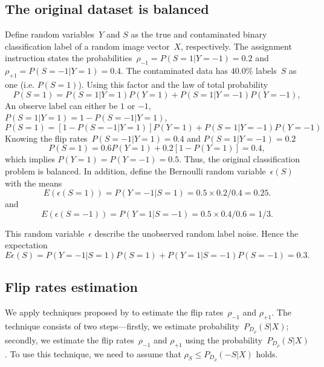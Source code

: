\documentclass[12pt]{article} %
\newcommand{\rhoo}{\rho_{+1}}
\newcommand{\rhoz}{\rho_{-1}}
\begin{document}
\subsection{The original dataset is balanced} \label{sec:1}
Define random variables~$Y$ and $S$ as the true and contaminated binary classification label of a random image vector~$X$, respectively. The assignment instruction states the probabilities~$\rhoz=P(S=1|Y=-1)=0.2$ and $\rhoo=P(S=-1|Y=1)=0.4$.
The contaminated data has $40.0\%$ labels~$S$ as one (i.e. $P(S=1)$). Using this factor and the law of total probability
\begin{equation*}
P(S=1)=P(S=1|Y=1)P(Y=1)+P(S=1|Y=-1)P(Y=-1),
\end{equation*}
An observe label can either be $1$ or $-1$, $P(S=1|Y=1)=1-P(S=-1|Y=1)$,
\begin{equation*}
P(S=1)=\left[1-P(S=-1|Y=1)\right]P(Y=1)+P(S=1|Y=-1)P(Y=-1)
\end{equation*}
Knowing the flip rates~$P(S=-1|Y=1)=0.4$ and $P(S=1|Y=-1)=0.2$
\begin{equation}
P(S=1)=0.6P(Y=1)+0.2\left[1-P(Y=1)\right]=0.4, \label{eq:ps}
\end{equation}
which implies $P(Y=1)=P(Y=-1)=0.5$. Thus, the original classification problem is balanced.
In addition, define the Bernoulli random variable~$\epsilon(S)$ with the means 
\begin{equation}\label{eq:e1}
  E(\epsilon(S=1))=P(Y=-1|S=1)=0.5\times0.2/0.4=0.25.  
\end{equation}
and 
\begin{equation}\label{eq:em1}
  E(\epsilon(S=-1))=P(Y=1|S=-1)=0.5\times0.4/0.6=1/3.  
\end{equation}

This random variable~$\epsilon$ describe the unobserved random label noise. Hence the expectation
\begin{equation}
    E\epsilon(S)=P(Y=-1|S=1)P(S=1)+P(Y=1|S=-1)P(S=-1)
    =0.3.\label{eq:exp}
\end{equation}

\subsection{Flip rates estimation}\label{method2}
We apply techniques proposed by \citet{liu2016classification} to estimate the flip rates~$\rhoz$ and $\rhoo$. The technique consists of two steps---firstly, we estimate probability~$P_{D_\rho}(S|X)$; secondly, we estimate the flip rates~$\rhoz$ and $\rhoo$ using the probability~$P_{D_\rho}(S|X)$.
To use this technique, we need to assume that $\rho_{S}\leq P_{D_\rho}(-S|X)$ holds.
\end{document}
